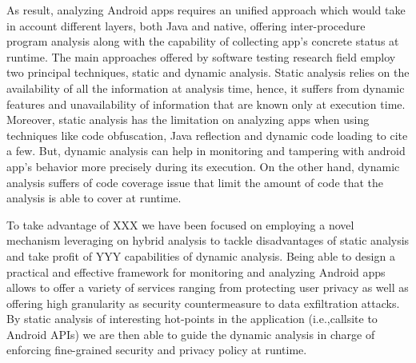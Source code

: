As result, analyzing Android apps requires an unified approach which would take in account different layers, both Java and native, offering inter-procedure program analysis along with the capability of collecting app's concrete status at runtime. The main approaches offered by software testing research field employ two principal techniques, static and dynamic analysis. Static analysis relies on the availability of all the information at analysis time, hence, it suffers  from dynamic features and unavailability of information that are known only at execution time. Moreover, static analysis has the limitation on analyzing apps when using techniques like code obfuscation, Java reflection and dynamic code loading to cite a few. But, dynamic analysis can help in monitoring and tampering with android app's behavior more precisely during its execution. On the other hand, dynamic analysis suffers of code coverage issue that limit the amount of code that the analysis is able to cover at runtime. 

To take advantage of XXX we have been focused on employing a novel mechanism leveraging on hybrid analysis to tackle disadvantages of static analysis and take profit of YYY capabilities of dynamic analysis. Being able to design a practical and effective framework for monitoring and analyzing Android apps allows to offer a variety of services ranging from protecting user privacy as well as offering high granularity as security countermeasure to data exfiltration attacks. By static analysis of interesting hot-points in the application (i.e.,callsite to Android APIs) we are then able to guide the dynamic analysis in charge of enforcing fine-grained security and privacy policy at runtime.

